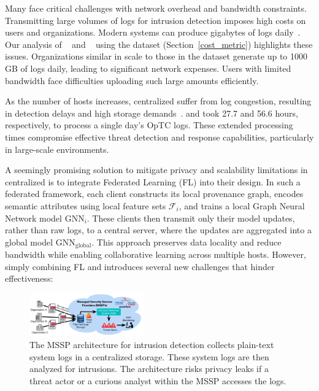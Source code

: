 Many \pids face critical challenges with network overhead and bandwidth constraints. Transmitting large volumes of logs for intrusion detection imposes high costs on users and organizations. Modern systems can produce gigabytes of logs daily~\cite{inam2023sok,hossain+depend}. Our analysis of \flash~\cite{flash2024} and \kairos~\cite{cheng2023kairos} using the \optc dataset (Section~\ref{cost_metric}) highlights these issues. Organizations similar in scale to those in the \optc dataset generate up to 1000 GB of logs daily, leading to significant network expenses. Users with limited bandwidth face difficulties uploading such large amounts efficiently.

As the number of hosts increases, centralized \pids suffer from log congestion, resulting in detection delays and high storage demands~\cite{dong2023distdet}. \flash and \kairos took 27.7 and 56.6 hours, respectively, to process a single day's OpTC logs. These extended processing times compromise effective threat detection and response capabilities, particularly in large-scale environments.



\smallskip
{}
\smallskip

\noindent
A seemingly promising solution to mitigate privacy and scalability limitations in centralized \pids is to integrate Federated Learning (FL) into their design. In such a federated \pids framework, each client constructs its local provenance graph, encodes semantic attributes using local feature sets \( \mathcal{F}_i \), and trains a local Graph Neural Network model \( \text{GNN}_{i} \). These clients then transmit only their model updates, rather than raw logs, to a central server, where the updates are aggregated into a global model \( \text{GNN}_{\text{global}} \). This approach preserves data locality and reduce bandwidth while enabling collaborative learning across multiple hosts. However, simply combining FL and \pids introduces several new challenges that hinder effectiveness:

\begin{figure}[t!]
  \centering
  \includegraphics[width=0.44\textwidth]{fig/mssp.pdf}
  \caption{The MSSP architecture for intrusion detection collects plain-text system logs in a centralized storage. These system logs are then analyzed for intrusions. The architecture risks privacy leaks if a threat actor or a curious analyst within the MSSP accesses the logs.}
  \label{mssp}
  \vspace{-4ex}
\end{figure}


